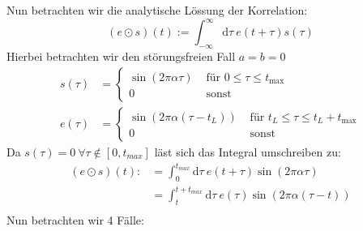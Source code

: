 \documentclass[ngerman]{scrartcl}
\begin{document}
\subsection{}
Nun betrachten wir die analytische L\"ossung der Korrelation:
\begin{equation*}
	(e \odot s)(t):=\int_{-\infty}^{\infty} \mathrm{d} \tau~ e(t+\tau) s(\tau)
\end{equation*}
Hierbei betrachten wir den st\"orungsfreien Fall $a=b=0$
\begin{align*}
	s(\tau)&=\left\{\begin{array}{ll}
		\sin (2 \pi \alpha \tau) & \text { für } 0 \leq \tau \leq t_{\max } \\
		0 & \text { sonst }
		\end{array}\right.\\
	e(\tau)&=\left\{\begin{array}{ll}
	\sin (2 \pi \alpha (\tau-t_L)) & \text { für } t_L \leq \tau \leq t_L+t_{\max } \\
	0 & \text { sonst }
	\end{array}\right.
\end{align*}
Da  $s(\tau)=0~\forall\tau\notin[0,t_{max}]$ l\"ast sich das Integral umschreiben zu:
\begin{align*}
	(e \odot s)(t):&=\int_{0}^{t_{max}} \mathrm{d} \tau~ e(t+\tau) \sin(2\pi\alpha\tau)\\
	&=\int_{t}^{t+t_{max}} \mathrm{d} \tau~ e(\tau) \sin(2\pi\alpha(\tau-t))\\
\end{align*}
Nun betrachten wir 4 F\"alle:
\end{document}
